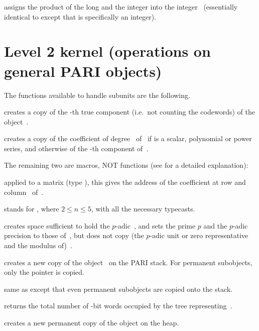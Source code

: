  assigns the product of the long
 and the integer  into the integer~ (essentially
identical to  except that  is specifically an integer).

\section{Level 2 kernel (operations on general PARI objects)}

\noindent The functions available to handle subunits are the following.

 creates a copy of the -th true
component (i.e.\ not counting the codewords) of the object~.

 creates a copy of the coefficient of
degree~ of~ if  is a scalar, polynomial or power series,
and otherwise of the -th component of~.

\noindent %
The remaining two are macros, NOT functions (see  for a
detailed explanation):

 applied to a matrix  (type
), this gives the address of the coefficient at row  and
column~ of~.

 stands for
, where $2\le n \le 5$, with all the
necessary typecasts.


 creates space sufficient to hold the $p$-adic~,
and sets the prime $p$ and the $p$-adic precision to those of~, but
does not copy (the $p$-adic unit or zero representative and the modulus
of)~.

 creates a new copy of the object~ on the PARI
stack. For permanent subobjects, only the pointer is copied.

 same as  except that even permanent
subobjects are copied onto the stack.

 returns the total number of \B-bit words occupied
by the tree representing~.

 creates a new permanent copy of the object 
on the heap.


